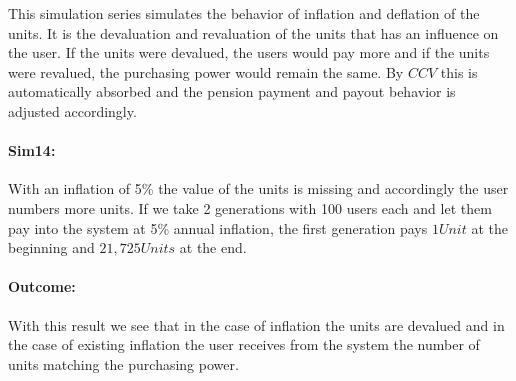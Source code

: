 This simulation series simulates the behavior of inflation and deflation of the units. It is the devaluation and revaluation of the units that has an influence on the user. If the units were devalued, the users would pay more and if the units were revalued, the purchasing power would remain the same. By $CCV$ this is automatically absorbed and the pension payment and payout behavior is adjusted accordingly. 

\paragraph{Sim14:} 
With an inflation of 5\% the value of the units is missing and accordingly the user numbers more units. If we take 2 generations with 100 users each and let them pay into the system at 5\% annual inflation, the first generation pays $1 Unit$ at the beginning and $21,725 Units$ at the end. 

\paragraph{Outcome:}

\begin{table}[hbt!]
\centering
{}
\end{table}

With this result we see that in the case of inflation the units are devalued and in the case of existing inflation the user receives from the system the number of units matching the purchasing power.

